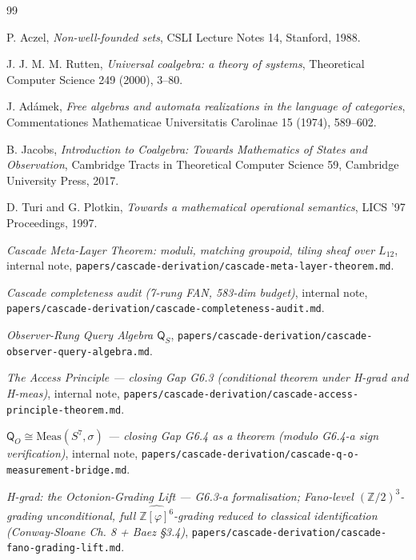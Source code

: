\documentclass[11pt, a4paper]{amsart}
\theoremstyle{definition}
\newcommand{\Z}{\mathbb{Z}}
\newcommand{\Qalg}{\mathsf{Q}}
\begin{document}
\begin{thebibliography}{99}

P. Aczel, \emph{Non-well-founded sets}, CSLI Lecture Notes 14,
Stanford, 1988.

J. J. M. M. Rutten, \emph{Universal coalgebra: a theory of
systems}, Theoretical Computer Science 249 (2000), 3--80.

J. Ad\'amek, \emph{Free algebras and automata realizations in
the language of categories}, Commentationes Mathematicae
Universitatis Carolinae 15 (1974), 589--602.

B. Jacobs, \emph{Introduction to Coalgebra: Towards
Mathematics of States and Observation}, Cambridge Tracts in
Theoretical Computer Science 59, Cambridge University Press, 2017.

D. Turi and G. Plotkin, \emph{Towards a mathematical operational
semantics}, LICS '97 Proceedings, 1997.

\emph{Cascade Meta-Layer Theorem: moduli, matching groupoid,
tiling sheaf over $L_{12}$}, internal note,
\texttt{papers/cascade-derivation/cascade-meta-layer-theorem.md}.

\emph{Cascade completeness audit (7-rung FAN, 583-dim budget)},
internal note,
\texttt{papers/cascade-derivation/cascade-completeness-audit.md}.

\emph{Observer-Rung Query Algebra $\Qalg_S$},
\texttt{papers/cascade-derivation/cascade-observer-query-algebra.md}.

\emph{The Access Principle --- closing Gap G6.3 (conditional
theorem under H-grad and H-meas)}, internal note,
\texttt{papers/cascade-derivation/cascade-access-principle-theorem.md}.

\emph{$\Qalg_O \cong \mathrm{Meas}(S^7, \sigma)$ --- closing
Gap G6.4 as a theorem (modulo G6.4-a sign verification)},
internal note,
\texttt{papers/cascade-derivation/cascade-q-o-measurement-bridge.md}.

\emph{H-grad: the Octonion-Grading Lift --- G6.3-a formalisation;
Fano-level $(\Z/2)^3$-grading unconditional, full
$\widehat{\Z[\varphi]^6}$-grading reduced to classical
identification (Conway-Sloane Ch. 8 + Baez \S 3.4)},
\texttt{papers/cascade-derivation/cascade-fano-grading-lift.md}.


\end{thebibliography}
\end{document}
